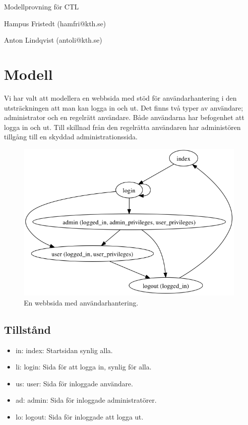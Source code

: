 \documentclass{article}
\begin{document}
  \centerline{\sc \large Modellprovning för CTL}
  \vspace{.5pc}
  \centerline{Hampus Fristedt (hamfri@kth.se)}
  \centerline{Anton Lindqvist (antoli@kth.se)}
  \vspace{2pc}

  \section{Modell}
  Vi har valt att modellera en webbsida med stöd för användarhantering i den
  utsträckningen att man kan logga in och ut. Det finns två typer av användare;
  administrator och en regelrätt användare. Både användarna har befogenhet att
  logga in och ut. Till skillnad från den regelrätta användaren har administören
  tillgång till en skyddad administrationssida.
  \begin{figure}[h!]
    \includegraphics[scale=0.4]{model.png}
    \caption{En webbsida med användarhantering.}
  \end{figure}

  \subsection{Tillstånd}

  \begin{itemize}

    \item in: index: Startsidan synlig alla.
    \item li: login: Sida för att logga in, synlig för alla.
    \item us: user: Sida för inloggade användare.
    \item ad: admin: Sida för inloggade administratörer. 
    \item lo: logout: Sida för inloggade att logga ut. 

  \end{itemize}
\end{document}
